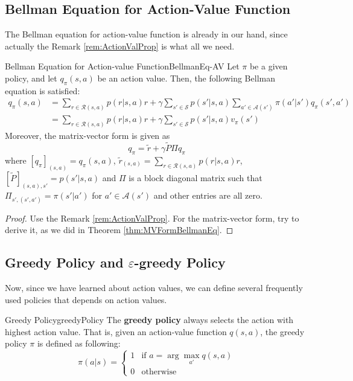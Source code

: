     \subsection{Bellman Equation for Action-Value Function}
        The Bellman equation for action-value function is already in our hand, since actually the Remark \ref{rem:ActionValProp}
        is what all we need.
        \begin{thm}{Bellman Equation for Action-value Function}{BellmanEq-AV}
            Let $\pi$ be a given policy, and let $q_\pi(s,a)$ be an action value. Then, the following Bellman equation is satisfied:
            \begin{align}
                q_\pi(s,a) &= \sum_{r \in \mathcal{R}(s,a)}p(r|s,a)r + \gamma \sum_{s' \in \mathcal{S}}p(s'|s,a)\sum_{a' \in \mathcal{A}(s')}\pi(a'|s')q_\pi(s',a') \\
                           &= \sum_{r \in \mathcal{R}(s,a)}p(r|s,a)r + \gamma \sum_{s' \in \mathcal{S}}p(s'|s,a)v_\pi(s') 
            \end{align}
            Moreover, the matrix-vector form is given as
            \begin{equation}
                q_\pi = \tilde{r} + \gamma \tilde{P} \Pi q_\pi
            \end{equation}
            where $[q_\pi]_{(s,a)}=q_\pi(s,a)$, $\tilde{r}_{(s,a)}=\sum_{r \in \mathcal{R}(s,a)}p(r|s,a)r$, $[\tilde{P}]_{(s,a),s'}=p(s'|s,a)$ and $\Pi$ is a block diagonal matrix
            such that $\Pi_{s',(s',a')}=\pi(s'|a')$ for $a' \in \mathcal{A}(s')$ and other entries are all zero.
        \end{thm}
        \begin{proof}
            Use the Remark \ref{rem:ActionValProp}. For the matrix-vector form, try to derive it, as we did in Theorem \ref{thm:MVFormBellmanEq}.
        \end{proof}
    \subsection{Greedy Policy and $\varepsilon$-greedy Policy}
        Now, since we have learned about action values, we can define several frequently used policies that depends on action values.
        \begin{defn}{Greedy Policy}{greedyPolicy}
            The \textbf{greedy policy} always selects the action with highest action value. That is, given an action-value function $q(s,a)$,
            the greedy policy $\pi$ is defined as following:
            \begin{equation}
                \pi(a|s) = \begin{cases}
                    1 &\text{if } a = \arg\max_{a'}{q(s,a)} \\
                    0 &\text{otherwise}
                \end{cases}
            \end{equation}
        \end{defn}

